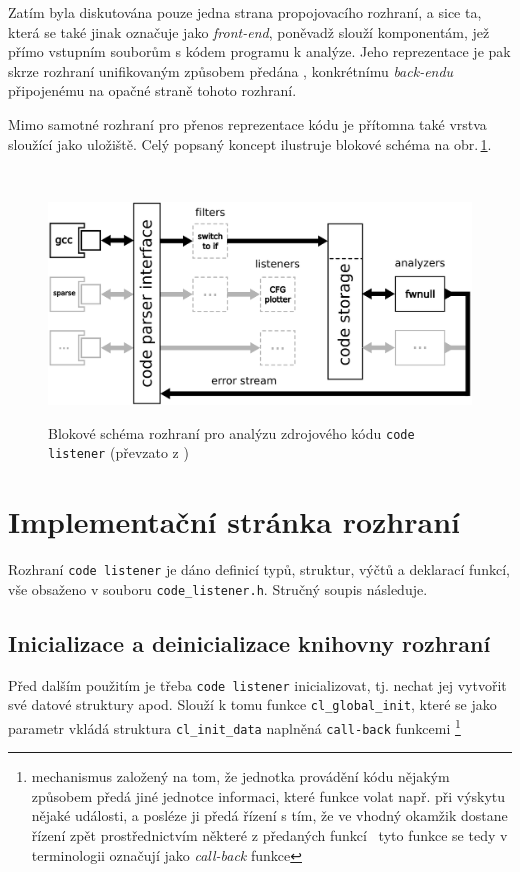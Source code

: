 Zatím byla diskutována pouze jedna strana propojovacího rozhraní, a sice
ta, která se také jinak označuje jako \emph{front-end}, poněvadž slouží
komponentám, jež přímo  vstupním souborům s kódem programu
k analýze. Jeho reprezentace je pak skrze rozhraní unifikovaným způsobem
předána , konkrétnímu \emph{back-endu} připojenému na opačné straně
tohoto rozhraní.

Mimo samotné rozhraní pro přenos reprezentace kódu je přítomna
také vrstva sloužící jako uložiště. Celý popsaný koncept ilustruje
blokové schéma na obr.\,\ref{fig:code-listener:api}.

\hspace*{\fill}\\[-\baselineskip]
\begin{figure}[!h]
    \begin{center}
        \includegraphics[width=1\textwidth,keepaspectratio]{fig/cl-block-diagram}
        \label{fig:code-listener:api}
        \caption{Blokové schéma rozhraní pro analýzu zdrojového kódu
                 \texttt{code listener} (převzato z \cite{web:FITVUTBR:VeriFIT:CodeListener})}
    \end{center}
\end{figure}


\section{Implementační stránka rozhraní}

Rozhraní \texttt{code listener} je dáno definicí typů, struktur,
výčtů a deklarací funkcí, vše obsaženo v souboru \texttt{code\_listener.h}.
Stručný soupis následuje.

\subsection{Inicializace a deinicializace knihovny rozhraní}
Před dalším použitím je třeba \texttt{code listener} inicializovat,
tj. nechat jej vytvořit své datové struktury apod. Slouží
k tomu funkce \texttt{cl\_global\_init}, které se jako parametr
vkládá struktura \texttt{cl\_init\_data} naplněná \texttt{call-back}
funkcemi%
%
\footnote{mechanismus založený na tom, že jednotka provádění kódu
nějakým způsobem předá jiné jednotce informaci, které funkce
volat např. při výskytu nějaké události, a posléze ji předá řízení
s tím, že ve vhodný okamžik dostane řízení zpět prostřednictvím
některé z předaných funkcí \ndash\ tyto funkce 
se tedy v terminologii označují jako \emph{call-back} funkce}%
%

